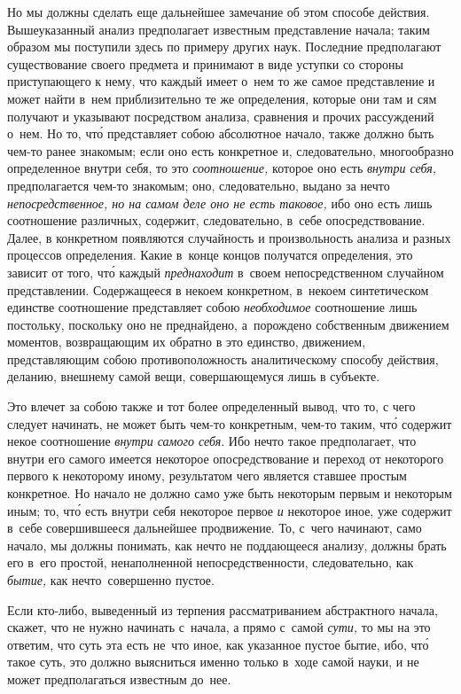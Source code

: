 Но мы должны сделать еще дальнейшее замечание об этом способе действия.
Вышеуказанный анализ предполагает известным представление начала; таким образом
мы поступили здесь по примеру других наук. Последние предполагают существование
своего предмета и принимают в виде уступки со стороны приступающего к нему, что
каждый имеет о~нем то же самое представление и может найти в~нем приблизительно
те же определения, которые они там и сям получают и указывают посредством
анализа, сравнения и прочих рассуждений о~нем. Но то, чт\'{о} представляет
собою абсолютное начало, также должно быть чем-то ранее знакомым; если оно есть
конкретное и, следовательно, многообразно определенное внутри себя, то это
{\em соотношение,} которое оно есть {\em внутри себя,} предполагается чем-то
знакомым; оно, следовательно, выдано за нечто {\em непосредственное, но на
самом деле оно не есть таковое,} ибо оно есть лишь соотношение различных,
содержит, следовательно, в~себе опосредствование. Далее, в конкретном
появляются случайность и произвольность анализа и разных процессов определения.
Какие в~конце концов получатся определения, это зависит от того, чт\'{о} каждый
{\em преднаходит} в~своем непосредственном случайном представлении.
Содержащееся в некоем конкретном, в~некоем синтетическом единстве соотношение
представляет собою {\em необходимое} соотношение лишь постольку, поскольку оно
не преднайдено, а~порождено собственным движением моментов, возвращающим их
обратно в это единство, движением, представляющим собою противоположность
аналитическому способу действия, деланию, внешнему самой вещи, совершающемуся
лишь в субъекте.

Это влечет за собою также и тот более определенный вывод, что то, с чего
следует начинать, не может быть чем-то конкретным, чем-то таким, чт\'{о}
содержит некое соотношение {\em внутри самого себя}. Ибо нечто такое
предполагает, что внутри его самого имеется некоторое опосредствование и
переход от некоторого первого к некоторому иному, результатом чего является
ставшее простым конкретное. Но начало не должно само уже быть некоторым первым
и некоторым иным; то, чт\'{о} есть внутри себя некоторое первое {\em и}
некоторое иное, уже содержит в~себе совершившееся дальнейшее продвижение. То,
с~чего начинают, само начало, мы должны понимать, как нечто не поддающееся
анализу, должны брать его в~его простой, ненаполненной непосредственности,
следовательно, как {\em бытие,} как нечто~совершенно пустое.

Если кто-либо, выведенный из терпения рассматриванием абстрактного начала,
скажет, что не нужно начинать с~начала, а прямо с~самой {\em сути,} то мы на
это ответим, что суть эта есть не~что иное, как указанное пустое бытие, ибо,
чт\'{о} такое суть, это должно выясниться именно только в~ходе самой науки,
и не может предполагаться известным до~нее.

